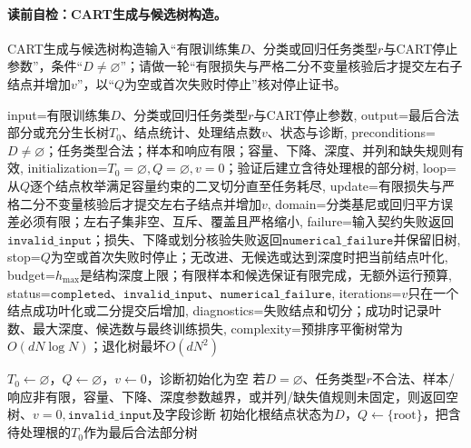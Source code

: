 \paragraph{读前自检：CART生成与候选树构造。}CART生成与候选树构造输入“有限训练集$D$、分类或回归任务类型$r$与CART停止参数”，条件“$D\ne\varnothing$”；请做一轮“有限损失与严格二分不变量核验后才提交左右子结点并增加$v$”，以“$Q$为空或首次失败时停止”核对停止证书。\par

\begin{AlgorithmContract}{
  input={有限训练集$D$、分类或回归任务类型$r$与CART停止参数},
  output={最后合法部分或充分生长树$T_0$、结点统计、处理结点数$v$、状态与诊断},
  preconditions={$D\ne\varnothing$；任务类型合法；样本和响应有限；容量、下降、深度、并列和缺失规则有效},
  initialization={$T_0=\varnothing,Q=\varnothing,v=0$；验证后建立含待处理根的部分树},
  loop={从$Q$逐个结点枚举满足容量约束的二叉切分直至任务耗尽},
  update={有限损失与严格二分不变量核验后才提交左右子结点并增加$v$},
  domain={分类基尼或回归平方误差必须有限；左右子集非空、互斥、覆盖且严格缩小},
  failure={输入契约失败返回$\mathtt{invalid\_input}$；损失、下降或划分核验失败返回$\mathtt{numerical\_failure}$并保留旧树},
  stop={$Q$为空或首次失败时停止；无改进、无候选或达到深度时把当前结点叶化},
  budget={$h_{\max}$是结构深度上限；有限样本和候选保证有限完成，无额外运行预算},
  status={$\mathtt{completed}$、$\mathtt{invalid\_input}$、$\mathtt{numerical\_failure}$},
  iterations={$v$只在一个结点成功叶化或二分提交后增加},
  diagnostics={失败结点和切分；成功时记录叶数、最大深度、候选数与最终训练损失},
  complexity={预排序平衡树常为$O(dN\log N)$；退化树最坏$O(dN^2)$}
}
\begin{algorithm}[H]
\caption{CART生成与候选树构造}\label{alg:V2-C04-cart-grow}
$T_0\leftarrow\varnothing$，$Q\leftarrow\varnothing$，$v\leftarrow0$，诊断初始化为空\;
若$D=\varnothing$、任务类型$r$不合法、样本/响应非有限，容量、下降、深度参数越界，或并列/缺失值规则未固定，则返回空树、$v=0,\mathtt{invalid\_input}$及字段诊断\;
初始化根结点状态为$D$，$Q\leftarrow\{\mathrm{root}\}$，把含待处理根的$T_0$作为最后合法部分树\;
\end{algorithm}
\end{AlgorithmContract}
